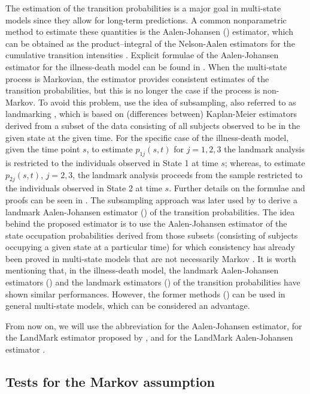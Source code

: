 The estimation of the transition probabilities is a major goal in multi-state models since they allow for long-term predictions. A common nonparametric method to estimate these quantities is the Aalen-Johansen () estimator, \citep{AJ1978} which can be obtained as the product–integral of the Nelson-Aalen estimators for the cumulative transition intensities \citep{Andersen1993}. Explicit formulae of the Aalen-Johansen estimator for the illness-death model can be found in \cite{Borgan2005}. When the multi-state process is Markovian, the  estimator provides consistent estimates of the transition probabilities, but this is no longer the case if the process is non-Markov. To avoid this problem, \cite{AlvarezMM2015} use the idea of subsampling, also referred to as landmarking \citep{VanHouwelingen2007}, which is based on (differences between) Kaplan-Meier estimators derived from a subset of the data consisting of all subjects observed to be in the given state at the given time. For the specific case of the illness-death model, given the time point $s$, to estimate $p_{1j}(s,t)$ for $j=1,2,3$ the landmark analysis is restricted to the individuals observed in State 1 at time $s$; whereas, to estimate $p_{2j}(s,t)$, $j=2,3$, the landmark analysis proceeds from the sample restricted to the individuals observed in State 2 at time $s$. Further details on the formulae and proofs can be seen in \cite{AlvarezMM2015}.
The subsampling approach was later used by \citet{PutterSpitoni2018} to derive a landmark Aalen-Johansen estimator () of the transition probabilities. The idea behind the proposed estimator is to use the Aalen-Johansen estimator of the state occupation probabilities derived from those subsets (consisting of subjects occupying a given state at a particular time) for which consistency has already been proved in multi-state models that are not necessarily Markov \citep{Datta2001}. It is worth mentioning that, in the illness-death model, the landmark Aalen-Johansen estimators () and the landmark estimators () of the transition probabilities have shown similar performances. However, the former methods () can be used in general multi-state models, which can be considered an advantage.

From now on, we will use the abbreviation  for the Aalen-Johansen estimator,  for the LandMark estimator proposed by \cite{AlvarezMM2015}, and  for the LandMark Aalen-Johansen estimator \citep{PutterSpitoni2018}.

\subsection{Tests for the Markov assumption} \label{sec2.3}

